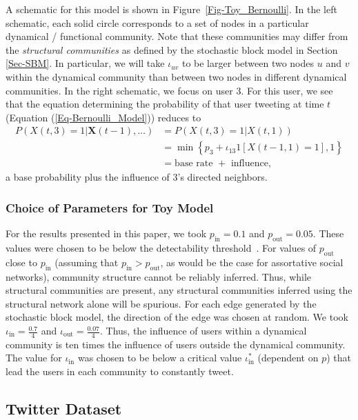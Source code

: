 \documentclass[12pt]{article}
\begin{document}
A schematic for this model is shown in Figure~\ref{Fig-Toy_Bernoulli}. In the left schematic, each solid circle corresponds to a set of nodes in a particular dynamical / functional community. Note that these communities may differ from the \emph{structural communities} as defined by the stochastic block model in Section \ref{Sec-SBM}. In particular, we will take $\iota_{uv}$ to be larger between two nodes $u$ and $v$ within the dynamical community than between two nodes in different dynamical communities. In the right schematic, we focus on user 3. For this user, we see that the equation determining the probability of that user tweeting at time $t$ (Equation (\ref{Eq-Bernoulli_Model})) reduces to
\begin{align}
	P(X(t, 3) = 1 | \mathbf{X}(t-1), \ldots) &= P(X(t,3) = 1 | X(t, 1)) \\
		&= \min \left\{p_{3} + \iota_{13} 1[X(t-1, 1) = 1], 1\right\}\\
		&= \text{base rate } + \text{ influence,}
\end{align}
a base probability plus the influence of 3's directed neighbors.

\subsubsection{Choice of Parameters for Toy Model}

For the results presented in this paper, we took $p_{\text{in}} = 0.1$ and $p_{\text{out}} = 0.05$. These values were chosen to be below the detectability threshold~\cite{decelle2011inference, mossel2012stochastic}. For values of $p_{\text{out}}$ close to $p_{\text{in}}$ (assuming that $p_{\text{in}} > p_{\text{out}}$, as would be the case for assortative social networks), community structure cannot be reliably inferred. Thus, while structural communities are present, any structural communities inferred using the structural network alone will be spurious. For each edge generated by the stochastic block model, the direction of the edge was chosen at random. We took $\iota_{\text{in}} = \frac{0.7}{4}$ and $\iota_{\text{out}} = \frac{0.07}{4}$. Thus, the influence of users within a dynamical community is ten times the influence of users outside the dynamical community. The value for $\iota_{\text{in}}$ was chosen to be below a critical value $\iota^{*}_{\text{in}}$ (dependent on $p$) that lead the users in each community to constantly tweet.

\subsection{Twitter Dataset}
\end{document}
